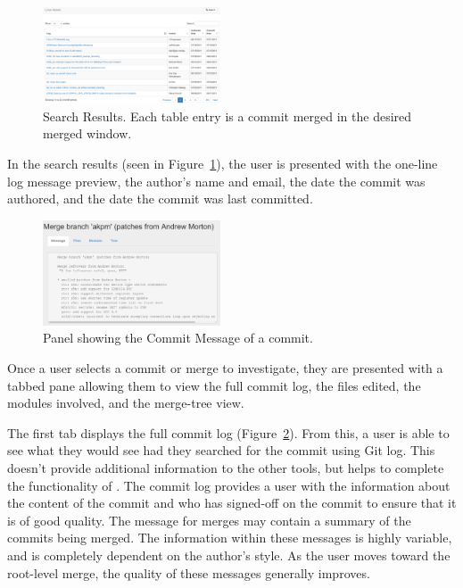 \documentclass[conference, draftclsnofoot, draft]{IEEEtran}
\begin{document}
\begin{figure}
        \centering
        \includegraphics[width=0.47\textwidth]{figures/search_results_2.png}
        \caption{Search Results. Each table entry is a commit merged in the desired
                merged window.}
        \label{fig:results}
\end{figure}

In the search results (seen in Figure~\ref{fig:results}), the user is presented with the one-line log message preview,
the author's name and email, the date the commit was authored, and the date the commit was last committed.

\begin{figure}
        \centering
        \includegraphics[width=0.47\textwidth]{figures/log_view.png}
        \caption{Panel showing the Commit Message of a commit.}
        \label{fig:message}
\end{figure}

Once a user selects a commit or merge to investigate, they are presented with a
tabbed pane allowing them to view the full commit log, the files edited, the modules
involved, and the merge-tree view.

The first tab displays the full commit log (Figure~\ref{fig:message}). From this, a
user is able to see what they would see had they searched for the commit using Git
log. This doesn't provide additional information to the other tools, but helps to
complete the functionality of \tool. The commit log provides a user with the
information about the content of the commit and who has signed-off on the commit to
ensure that it is of good quality. The message for merges may contain a summary of
the commits being merged.  The information within these messages is highly variable,
and is completely dependent on the author's style. As the user moves toward the
root-level merge, the quality of these messages generally improves.
\end{document}
